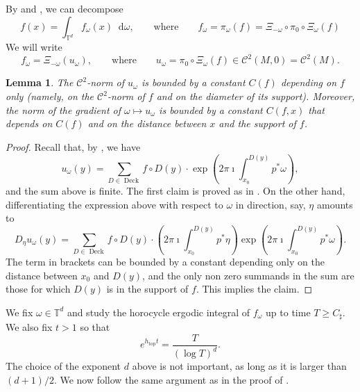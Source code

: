 \documentclass[11pt,letterpaper]{amsart}
\newcommand \T {{ \mathbb T}}
\newcommand \sC {{C_\sharp}}
\newcommand*{\diff}{\mathop{}\!\mathrm{d}}
\DeclareMathOperator{\topp}{top}
\DeclareMathOperator{\Deck}{Deck}
\newtheorem {lemma}[theorem]{Lemma}
\theoremstyle{definition}
\begin{document}
By  and , we can decompose
\begin{equation}\label{eq:split_of_f}
f(x) = \int_{\T^d} f_\omega(x) \diff \omega, \qquad \text{where} \qquad 
f_\omega = \pi_\omega(f) = \Xi_{-\omega} \circ \pi_0 \circ \Xi_{\omega}(f)
\end{equation}
We will write
\[
f_\omega = \Xi_{-\omega} (u_\omega), \qquad \text{where} \qquad u_\omega = \pi_0 \circ \Xi_{\omega}(f) \in \mathscr{C}^{2}(M,0) = \mathscr{C}^{2}(M).
\]
\begin{lemma}\label{lem:norm_u_omega}
The $\mathscr{C}^2$-norm of $u_\omega$ is bounded by a constant $C(f)$ depending on $f$ only (namely, on the $\mathscr{C}^2$-norm of $f$ and on the diameter of its support). Moreover, the norm of the gradient of $\omega \mapsto u_\omega$ is bounded by a constant $C(f,x)$ that depends on $C(f)$ and on the distance between $x$ and the support of $f$.
\end{lemma}
\begin{proof}
Recall that, by , we have
\[
u_\omega (y) = \sum_{D \in \Deck} f\circ D(y) \cdot \exp \left(2 \pi \imath \int_{x_0}^{D(y)} p^{\ast} \omega\right),
\]
and the sum above is finite. The first claim is proved as in . On the other hand, differentiating the expression above with respect to $\omega$ in direction, say, $\eta$ amounts to 
\[
D_{\eta} u_\omega (y)= \sum_{D \in \Deck} f\circ D(y) \cdot \left(2 \pi \imath \int_{x_0}^{D(y)} p^{\ast} \eta \right) \exp\left(2 \pi \imath \int_{x_0}^{D(y)} p^{\ast} \omega\right).
\]
The term in brackets can be bounded by a constant depending only on the distance between $x_0$ and $D(y)$, and the only non zero summands in the sum are those for which $D(y)$ is in the support of $f$. This implies the claim.
\end{proof}

We fix $\omega \in \T^d$ and study the horocycle ergodic integral of $f_\omega$ up to time $T\geq \sC$. 
We also fix $t > 1$ so that 
\begin{equation}\label{eq:choice_of_t}
e^{h_{\topp}t}  = \frac{T}{(\log T)^d}.
\end{equation}
The choice of the exponent $d$ above is not important, as long as it is larger than $(d+1)/2$.
We now follow the same argument as in the proof of .
 
\end{document}
